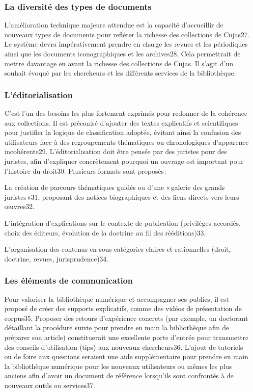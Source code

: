 \subsubsection{La diversité des types de documents}

L’amélioration technique majeure attendue est la capacité d’accueillir de nouveaux types de documents pour refléter la richesse des collections de Cujas27. Le système devra impérativement prendre en charge les revues et les périodiques ainsi que les documents iconographiques et les archives28. Cela permettrait de mettre davantage en avant la richesse des collections de Cujas. Il s’agit d’un souhait évoqué par les chercheurs et les différents services de la bibliothèque.  

\subsubsection{L’éditorialisation} 

C’est l’un des besoins les plus fortement exprimés pour redonner de la cohérence aux collections. Il est préconisé d’ajouter des textes explicatifs et scientifiques pour justifier la logique de classification adoptée, évitant ainsi la confusion des utilisateurs face à des regroupements thématiques ou chronologiques d’apparence incohérente29. L’éditorialisation doit être pensée par des juristes pour des juristes, afin d’expliquer concrètement pourquoi un ouvrage est important pour l’histoire du droit30. Plusieurs formats sont proposés :  

La création de parcours thématiques guidés ou d’une « galerie des grands juristes »31, proposant des notices biographiques et des liens directs vers leurs œuvres32. 

L’intégration d’explications sur le contexte de publication (privilèges accordés, choix des éditeurs, évolution de la doctrine au fil des rééditions)33.  

L’organisation des contenus en sous-catégories claires et rationnelles (droit, doctrine, revues, jurisprudence)34. 

\subsubsection{Les éléments de communication} 

Pour valoriser la bibliothèque numérique et accompagner ses publics, il est proposé de créer des supports explicatifs, comme des vidéos de présentation de corpus35. Proposer des retours d’expérience concrets (par exemple, un doctorant détaillant la procédure suivie pour prendre en main la bibliothèque afin de préparer son article) constituerait une excellente porte d’entrée pour transmettre des conseils d’utilisation (tips) aux nouveaux chercheurs36. L’ajout de tutoriels ou de foire aux questions seraient une aide supplémentaire pour prendre en main la bibliothèque numérique pour les nouveaux utilisateurs ou mêmes les plus anciens afin d’avoir un document de référence lorsqu’ils sont confrontés à de nouveaux outils ou services37.  

